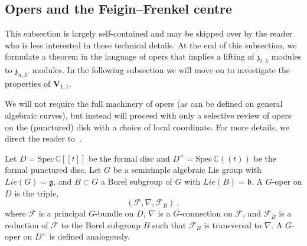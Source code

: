 \documentclass[a4paper]{article}
\def\IC{\mathbb{C}}
\def\gf{\mathfrak{g}}
\def \zf{\mathfrak{z}}
\def\V{\mathbf{V}}
\begin{document}
\subsection{\label{subsec:opers_and_FF}Opers and the Feigin--Frenkel centre}

This subsection is largely self-contained and may be skipped over by the reader who is less interested in these technical details. At the end of this subsection, we formulate a theorem in the language of opers that implies a lifting of $\zf_{t,\lambda}$ modules to $\zf_{u,\lambda'}$ modules. In the following subsection we will move on to investigate the properties of $\V_{1,1}$.

We will not require the full machinery of opers (as can be defined on general algebraic curves), but instead will proceed with only a selective review of opers on the (punctured) disk with a choice of local coordinate. For more details, we direct the reader to~\cite{Frenkel:2004,Frenkel:2007}.

Let $D=\mathrm{Spec}\, \IC[\![t]\!]$ be the formal disc and $D^\times=\mathrm{Spec}\, \IC(\!(t)\!)$ be the formal punctured disc. Let $G$ be a semisimple algebraic Lie group with $Lie(G)=\gf$, and $B\subset G$ a Borel subgroup of $G$ with $Lie(B)=\mathfrak{b}$. A $G$-oper on $D$ is the triple,
\begin{equation}
	(\mathscr{F},\nabla,\mathscr{F}_B)~,
\end{equation}
where $\mathscr{F}$ is a principal $G$-bundle on $D$, $\nabla$ is a $G$-connection on $\mathscr{F}$, and $\mathscr{F}_B$ is a reduction of $\mathscr{F}$ to the Borel subgroup $B$ such that $\mathscr{F}_B$ is transversal to $\nabla$. A $G$-oper on $D^\times$ is defined analogously.
\end{document}
